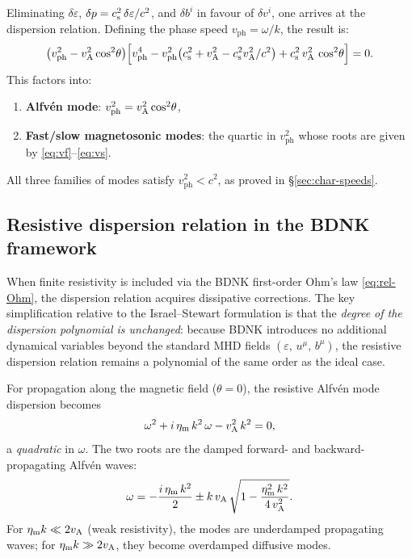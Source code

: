 Eliminating $\delta\varepsilon$, $\delta p = c_{\mathrm{s}}^{2}\,\delta\varepsilon/c^{2}$,
and $\delta b^{i}$ in favour of $\delta v^{i}$, one arrives at the
dispersion relation.  Defining the phase speed $v_{\mathrm{ph}}=\omega/k$,
the result is:
\begin{equation}
  \bigl(v_{\mathrm{ph}}^{2} - v_{\mathrm{A}}^{2}\cos^{2}\!\theta\bigr)
  \Bigl[v_{\mathrm{ph}}^{4}
    - v_{\mathrm{ph}}^{2}\bigl(c_{\mathrm{s}}^{2}+v_{\mathrm{A}}^{2}
      -c_{\mathrm{s}}^{2}v_{\mathrm{A}}^{2}/c^{2}\bigr)
    + c_{\mathrm{s}}^{2}\,v_{\mathrm{A}}^{2}\,\cos^{2}\!\theta\Bigr] = 0.
  \label{eq:dispersion-full}
\end{equation}
This factors into:
\begin{enumerate}
  \item \textbf{Alfv\'en mode}: $v_{\mathrm{ph}}^{2} = v_{\mathrm{A}}^{2}\cos^{2}\!\theta$,
  \item \textbf{Fast/slow magnetosonic modes}: the quartic in
        $v_{\mathrm{ph}}^{2}$ whose roots are given by
        \eqref{eq:vf}--\eqref{eq:vs}.
\end{enumerate}
All three families of modes satisfy $v_{\mathrm{ph}}^{2} < c^{2}$, as
proved in \S\ref{sec:char-speeds}.

\subsection{Resistive dispersion relation in the BDNK framework}
\label{sec:resistive-dispersion-bdnk}

When finite resistivity is included via the BDNK first-order Ohm's law
\eqref{eq:rel-Ohm}, the dispersion relation acquires dissipative
corrections.  The key simplification relative to the Israel--Stewart
formulation is that the \emph{degree of the dispersion polynomial is
unchanged}: because BDNK introduces no additional dynamical variables
beyond the standard MHD fields $(\varepsilon,\,u^{\mu},\,b^{\mu})$,
the resistive dispersion relation remains a polynomial of the same
order as the ideal case.

For propagation along the magnetic field ($\theta=0$), the resistive
Alfv\'en mode dispersion becomes
\begin{equation}
  \omega^{2} + i\,\eta_{\mathrm{m}}\,k^{2}\,\omega
  - v_{\mathrm{A}}^{2}\,k^{2} = 0,
  \label{eq:alfven-resistive-bdnk}
\end{equation}
a \emph{quadratic} in $\omega$.  The two roots are the damped
forward- and backward-propagating Alfv\'en waves:
\begin{equation}
  \omega = -\frac{i\,\eta_{\mathrm{m}}\,k^{2}}{2}
  \pm k\,v_{\mathrm{A}}\,\sqrt{1 - \frac{\eta_{\mathrm{m}}^{2}\,k^{2}}{4\,v_{\mathrm{A}}^{2}}}.
  \label{eq:alfven-resistive-roots}
\end{equation}
For $\eta_{\mathrm{m}}k \ll 2v_{\mathrm{A}}$ (weak resistivity), the modes are
underdamped propagating waves; for $\eta_{\mathrm{m}}k \gg 2v_{\mathrm{A}}$,
they become overdamped diffusive modes.


